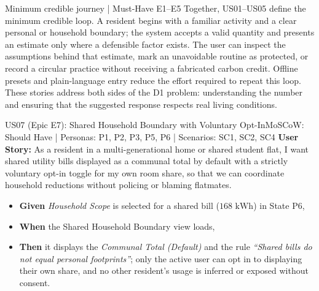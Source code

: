 \documentclass[12pt,a4paper]{article}
\begin{document}
\begin{insightbox}{Minimum credible journey | Must-Have E1--E5}
Together, US01--US05 define the minimum credible loop. A resident begins with a familiar activity and a clear personal or household boundary; the system accepts a valid quantity and presents an estimate only where a defensible factor exists. The user can inspect the assumptions behind that estimate, mark an unavoidable routine as protected, or record a circular practice without receiving a fabricated carbon credit. Offline presets and plain-language entry reduce the effort required to repeat this loop. These stories address both sides of the D1 problem: understanding the number and ensuring that the suggested response respects real living conditions.
\end{insightbox}

\Needspace{0.30\textheight}
\begin{storybox}{US07 (Epic E7): Shared Household Boundary with Voluntary Opt-In}{MoSCoW: Should Have | Personas: P1, P2, P3, P5, P6 | Scenarios: SC1, SC2, SC4}
\textbf{User Story:} As a resident in a multi-generational home or shared student flat, I want shared utility bills displayed as a communal total by default with a strictly voluntary opt-in toggle for my own room share, so that we can coordinate household reductions without policing or blaming flatmates.
\begin{itemize}
    \item \textbf{Given} \textit{Household Scope} is selected for a shared bill ($168\text{ kWh}$) in State P6,
    \item \textbf{When} the Shared Household Boundary view loads,
    \item \textbf{Then} it displays the \textit{Communal Total (Default)} and the rule \textit{``Shared bills do not equal personal footprints''}; only the active user can opt in to displaying their own share, and no other resident's usage is inferred or exposed without consent.
\end{itemize}
\end{storybox}

\vspace{0.28cm}
\end{document}
